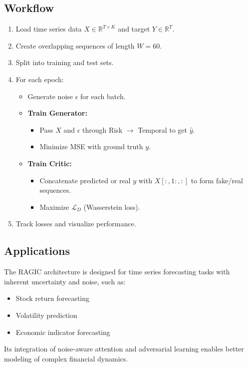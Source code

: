\subsection{Workflow}

\begin{enumerate}
    \item Load time series data $X \in \mathbb{R}^{T \times K}$ and target $Y \in \mathbb{R}^T$.
    \item Create overlapping sequences of length $W=60$.
    \item Split into training and test sets.
    \item For each epoch:
    \begin{itemize}
        \item Generate noise $\epsilon$ for each batch.
        \item \textbf{Train Generator:}
            \begin{itemize}
                \item Pass $X$ and $\epsilon$ through Risk $\rightarrow$ Temporal to get $\hat{y}$.
                \item Minimize MSE with ground truth $y$.
            \end{itemize}
        \item \textbf{Train Critic:}
            \begin{itemize}
                \item Concatenate predicted or real $y$ with $X[:, 1:, :]$ to form fake/real sequences.
                \item Maximize $\mathcal{L}_D$ (Wasserstein loss).
            \end{itemize}
    \end{itemize}
    \item Track losses and visualize performance.
\end{enumerate}

\subsection{Applications}

The RAGIC architecture is designed for time series forecasting tasks with inherent uncertainty and noise, such as:
\begin{itemize}
    \item Stock return forecasting
    \item Volatility prediction
    \item Economic indicator forecasting
\end{itemize}

Its integration of noise-aware attention and adversarial learning enables better modeling of complex financial dynamics.
